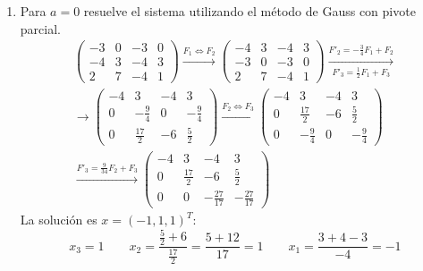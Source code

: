 \begin{ejercicio}
\begin{enumerate}
    \item Para $a=0$ resuelve el sistema utilizando el método de Gauss con pivote parcial.
    \begin{multline*}
        \left(\begin{array}{ccc|c}
            -3 & 0 & -3 & 0\\
             -4 & 3 & -4  & 3\\
             2 & 7 & -4 & 1
        \end{array}
        \right) \xrightarrow{F_1 \Longleftrightarrow F_2}
        \left(\begin{array}{ccc|c}
            -4 & 3 & -4  & 3\\
            -3 & 0 & -3 & 0\\
             2 & 7 & -4 & 1
        \end{array}
        \right)
        \xrightarrow[F'_3=\frac{1}{2}F_1 + F_3]{F'_2=-\frac{3}{4}F_1 + F_2} \\
        \longrightarrow \left(\begin{array}{ccc|c}
            -4 & 3 & -4  & 3\\
             0 & -\frac{9}{4} & 0 & -\frac{9}{4}\\
             0 & \frac{17}{2} & -6 & \frac{5}{2}
        \end{array}
        \right)
        \xrightarrow{F_2 \Longleftrightarrow F_3}
        \left(\begin{array}{ccc|c}
            -4 & 3 & -4  & 3\\
            0 & \frac{17}{2} & -6 & \frac{5}{2} \\
             0 & -\frac{9}{4} & 0 & -\frac{9}{4}       
        \end{array}
        \right) \\
        \xrightarrow{F'_3=\frac{9}{34}F_2 + F_3}
        \left(\begin{array}{ccc|c}
            -4 & 3 & -4  & 3\\
            0 & \frac{17}{2} & -6 & \frac{5}{2} \\
             0 & 0 & -\frac{27}{17} & -\frac{27}{17}
        \end{array}
        \right) 
    \end{multline*}
    La solución es $x=(-1, 1, 1)^T$:
    \begin{equation*}
        x_3 = 1 \qquad x_2 = \frac{\frac{5}{2}+6}{\frac{17}{2}} = \frac{5+12}{17} = 1 \qquad x_1 = \frac{3+4-3}{-4} = -1
    \end{equation*}


\end{enumerate}
\end{ejercicio}
